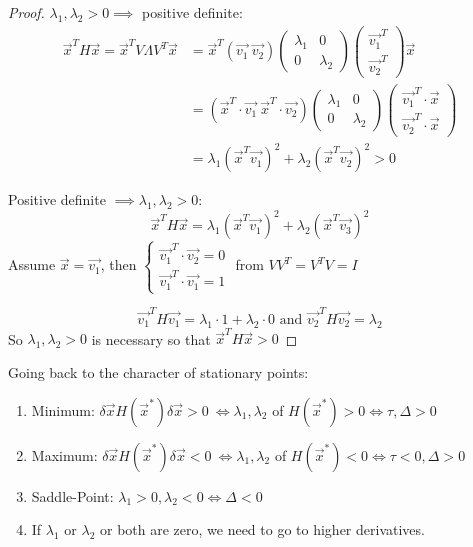 \documentclass[twoside]{scrartcl}
\begin{document}
\begin{proof}
$\lambda_1,\lambda_2 > 0 \implies$ positive definite:
\[\begin{aligned}\vec{x}^TH\vec{x} = \vec{x}^TV\Lambda V^T\vec{x} 
&= \vec{x}^T(\vec{v_1}~\vec{v_2})\begin{pmatrix}
\lambda_1 & 0 \\ 0 & \lambda_2	
\end{pmatrix}
\begin{pmatrix}
\vec{v_1}^T\\ \vec{v_2}^T	
\end{pmatrix}\vec{x}\\
&= (\vec{x}^T\cdot\vec{v_1} ~\vec{x}^T\cdot\vec{v_2})
\begin{pmatrix}
\lambda_1 & 0 \\ 0 & \lambda_2	
\end{pmatrix}
\begin{pmatrix}
\vec{v_1}^T\cdot\vec{x}\\ \vec{v_2}^T\cdot\vec{x}	
\end{pmatrix}\\
&= \lambda_1(\vec{x}^T\vec{v_1})^2 + \lambda_2(\vec{x}^T\vec{v_2})^2 > 0
\end{aligned}
\]

Positive definite $\implies \lambda_1,\lambda_2 > 0$:
\[\vec{x}^TH\vec{x} = \lambda_1(\vec{x}^T\vec{v_1})^2 +\lambda_2(\vec{x}^T\vec{v_3})^2  \]
Assume $\vec{x} = \vec{v_1}$, then 
$\begin{cases}
 	\vec{v_1}^T\cdot\vec{v_2} = 0\\
    \vec{v_1}^T\cdot\vec{v_1} = 1
 \end{cases}
 $
from $VV^T = V^TV = I$

\[\vec{v_1}^TH\vec{v_1} = \lambda_1\cdot 1 + \lambda_2 \cdot 0 \text{ and } \vec{v_2}^TH\vec{v_2} = \lambda_2\]
So $\lambda_1,\lambda_2 >0$ is necessary so that $\vec{x}^TH\vec{x} > 0$
\end{proof}

Going back to the character of stationary points: \begin{enumerate}
 \item Minimum: $\delta \vec{x}H(\vec{x}^*)\delta \vec{x} > 0\ \iff \lambda_1,\lambda_2$ of $H(\vec{x}^*) > 0 \iff \tau, \Delta >0$
 \item Maximum: $\delta \vec{x}H(\vec{x}^*)\delta \vec{x} < 0\ \iff \lambda_1,\lambda_2$ of $H(\vec{x}^*) < 0 \iff \tau <0, \Delta >0$
 \item Saddle-Point: $\lambda_1 >0, \lambda_2 < 0 \iff \Delta < 0$
 \item If $\lambda_1$ or $\lambda_2$ or both are zero, we need to go to higher derivatives. 
 \end{enumerate}~
\end{document}
